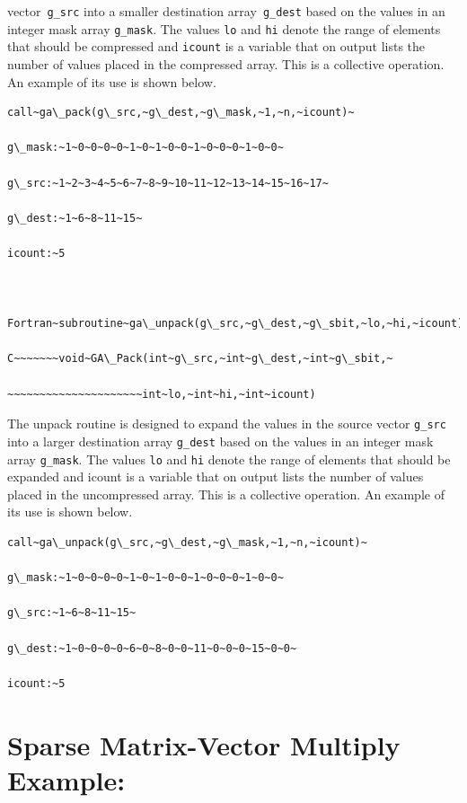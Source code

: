 vector\texttt{ g\_src} into a smaller destination array\texttt{ g\_dest}
based on the values in an integer mask array \texttt{g\_mask}. The
values \texttt{lo} and \texttt{hi} denote the range of elements that
should be compressed and \texttt{icount} is a variable that on output
lists the number of values placed in the compressed array. This is
a collective operation. An example of its use is shown below.
\begin{verbatim}
call~ga\_pack(g\_src,~g\_dest,~g\_mask,~1,~n,~icount)~

g\_mask:~1~0~0~0~0~1~0~1~0~0~1~0~0~0~1~0~0~

g\_src:~1~2~3~4~5~6~7~8~9~10~11~12~13~14~15~16~17~

g\_dest:~1~6~8~11~15~

icount:~5



Fortran~subroutine~ga\_unpack(g\_src,~g\_dest,~g\_sbit,~lo,~hi,~icount)~

C~~~~~~~void~GA\_Pack(int~g\_src,~int~g\_dest,~int~g\_sbit,~

~~~~~~~~~~~~~~~~~~~~~int~lo,~int~hi,~int~icount)
\end{verbatim}
The unpack routine is designed to expand the values in the source
vector \texttt{g\_src} into a larger destination array \texttt{g\_dest}
based on the values in an integer mask array \texttt{g\_mask}. The
values \texttt{lo} and \texttt{hi} denote the range of elements that
should be expanded and icount is a variable that on output lists the
number of values placed in the uncompressed array. This is a collective
operation. An example of its use is shown below.
\begin{verbatim}
call~ga\_unpack(g\_src,~g\_dest,~g\_mask,~1,~n,~icount)~

g\_mask:~1~0~0~0~0~1~0~1~0~0~1~0~0~0~1~0~0~

g\_src:~1~6~8~11~15~

g\_dest:~1~0~0~0~0~6~0~8~0~0~11~0~0~0~15~0~0~

icount:~5
\end{verbatim}

\section{Sparse Matrix-Vector Multiply Example:}


